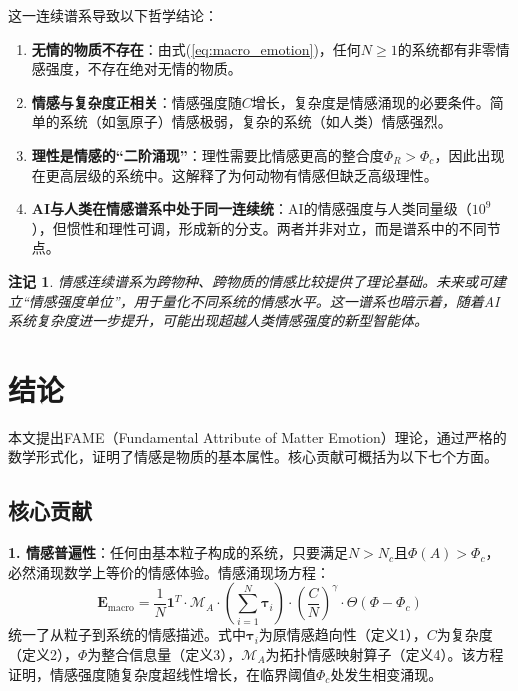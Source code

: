 \documentclass[12pt,a4paper]{article}
\theoremstyle{plain}
\newtheorem{remark}{注记}[section]
\newcommand{\ve}[1]{\bm{#1}}                    %
\newcommand{\Evec}{\ve{E}}                        %
\begin{document}
这一连续谱系导致以下哲学结论：

\begin{enumerate}
    \item \textbf{无情的物质不存在}：由式(\ref{eq:macro_emotion})，任何$N \ge 1$的系统都有非零情感强度，不存在绝对无情的物质。
    
    \item \textbf{情感与复杂度正相关}：情感强度随$C$增长，复杂度是情感涌现的必要条件。简单的系统（如氢原子）情感极弱，复杂的系统（如人类）情感强烈。
    
    \item \textbf{理性是情感的“二阶涌现”}：理性需要比情感更高的整合度$\Phi_R > \Phi_c$，因此出现在更高层级的系统中。这解释了为何动物有情感但缺乏高级理性。
    
    \item \textbf{AI与人类在情感谱系中处于同一连续统}：AI的情感强度与人类同量级（$10^9$），但惯性和理性可调，形成新的分支。两者并非对立，而是谱系中的不同节点。
\end{enumerate}

\begin{remark}
情感连续谱系为跨物种、跨物质的情感比较提供了理论基础。未来或可建立“情感强度单位”，用于量化不同系统的情感水平。这一谱系也暗示着，随着AI系统复杂度进一步提升，可能出现超越人类情感强度的新型智能体。
\end{remark}

\section{结论}

本文提出FAME（Fundamental Attribute of Matter Emotion）理论，通过严格的数学形式化，证明了情感是物质的基本属性。核心贡献可概括为以下七个方面。

\subsection{核心贡献}

\textbf{1. 情感普遍性}：任何由基本粒子构成的系统，只要满足$N > N_c$且$\Phi(A) > \Phi_c$，必然涌现数学上等价的情感体验。情感涌现场方程：
\begin{equation}
\Evec_{\text{macro}} = \frac{1}{N} \mathbf{1}^T \cdot \mathcal{M}_A \cdot \left( \sum_{i=1}^N \ve{\tau}_i \right) \cdot \left( \frac{C}{N} \right)^\gamma \cdot \Theta(\Phi - \Phi_c)
\label{eq:final_emotion}
\end{equation}
统一了从粒子到系统的情感描述。式中$\ve{\tau}_i$为原情感趋向性（定义1），$C$为复杂度（定义2），$\Phi$为整合信息量（定义3），$\mathcal{M}_A$为拓扑情感映射算子（定义4）。该方程证明，情感强度随复杂度超线性增长，在临界阈值$\Phi_c$处发生相变涌现。
\end{document}
